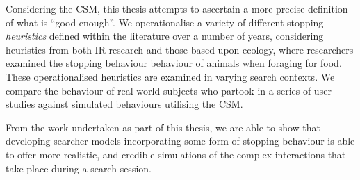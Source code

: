 \begin{preamble}[Abstract]
Considering the CSM, this thesis attempts to ascertain a more precise definition of what is ``good enough''. We operationalise a variety of different stopping \emph{heuristics} defined within the literature over a number of years, considering heuristics from both IR research and those based upon ecology, where researchers examined the stopping behaviour behaviour of animals when foraging for food. These operationalised heuristics are examined in varying search contexts. We compare the behaviour of real-world subjects who partook in a series of user studies against simulated behaviours utilising the CSM.

From the work undertaken as part of this thesis, we are able to show that developing searcher models incorporating some form of stopping behaviour is able to offer more realistic, and credible simulations of the complex interactions that take place during a search session. 


\end{preamble}
